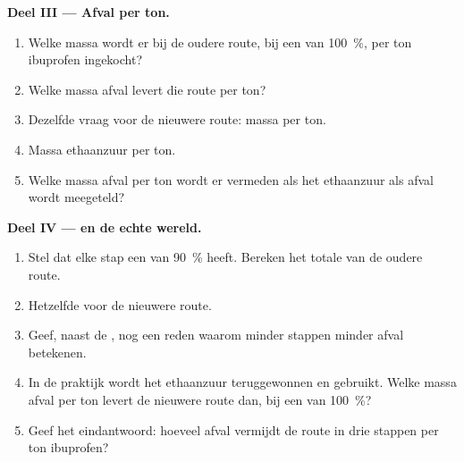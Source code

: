 \begin{problem}
\medskip
\noindent\textbf{Deel III --- Afval per ton.}
\begin{enumerate}[resume]
  \item Welke massa  wordt er bij de oudere route, bij een
         van \qty{100}{\percent}, per ton ibuprofen ingekocht?
  \item Welke massa afval levert die route per ton?
  \item Dezelfde vraag voor de nieuwere route: massa  per ton.
  \item Massa ethaanzuur per ton.
  \item Welke massa afval per ton wordt er vermeden als het ethaanzuur als
        afval wordt meegeteld?
\end{enumerate}

\medskip
\noindent\textbf{Deel IV ---  en de echte wereld.}
\begin{enumerate}[resume]
  \item Stel dat elke stap een  van \qty{90}{\percent} heeft.
        Bereken het totale  van de oudere route.
  \item Hetzelfde voor de nieuwere route.
  \item Geef, naast de , nog een reden waarom minder
        stappen minder afval betekenen.
  \item In de praktijk wordt het ethaanzuur teruggewonnen en gebruikt.
        Welke massa afval per ton levert de nieuwere route dan, bij een
         van \qty{100}{\percent}?
  \item Geef het eindantwoord: hoeveel afval vermijdt de route in drie
        stappen per ton ibuprofen?
\end{enumerate}
\end{problem}
